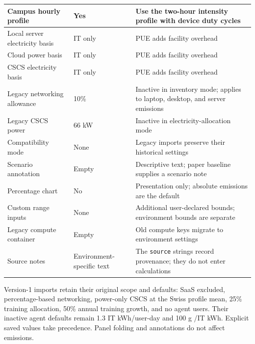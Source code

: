 {\begin{longtable}{|L{0.30\textwidth}|L{0.15\textwidth}|L{0.46\textwidth}|}
Campus hourly profile & Yes & Use the two-hour intensity profile with device duty cycles \\ \hline
Local server electricity basis & IT only & PUE adds facility overhead \\ \hline
Cloud power basis & IT only & PUE adds facility overhead \\ \hline
CSCS electricity basis & IT only & PUE adds facility overhead \\ \hline
Legacy networking allowance & 10\% & Inactive in inventory mode; applies to laptop, desktop, and server emissions \\ \hline
Legacy CSCS power & 66 kW & Inactive in electricity-allocation mode \\ \hline
Compatibility mode & None & Legacy imports preserve their historical settings \\ \hline
Scenario annotation & Empty & Descriptive text; paper baseline supplies a scenario note \\ \hline
Percentage chart & No & Presentation only; absolute emissions are the default \\ \hline
Custom range inputs & None & Additional user-declared bounds; environment bounds are separate \\ \hline
Legacy compute container & Empty & Old compute keys migrate to environment settings \\ \hline
Source notes & Environment-specific text & The \texttt{source} strings record provenance; they do not enter calculations \\ \hline
\end{longtable}

Version-1 imports retain their original scope and defaults: SaaS excluded,
percentage-based networking, power-only CSCS at the Swiss profile mean,
25\% training allocation, 50\% annual training growth, and no agent users.
Their inactive agent defaults remain 1.3 IT kWh/user-day and 100 g \coe/IT kWh.
Explicit saved values take precedence. Panel folding and annotations do not
affect emissions.

}
